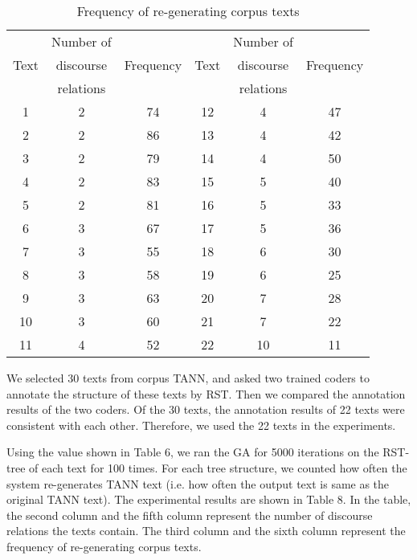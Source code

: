 \documentclass[english]{jnlp_1.2.0}
\begin{document}
\begin{table}[b]
\caption{Frequency of re-generating corpus texts} 
\begin{center}
 \begin{tabular}{|c|c|c||c|c|c|}               \hline
      & Number of &           &      & Number of &           \\ 
 Text & discourse & Frequency & Text & discourse & Frequency \\  
      & relations &           &      & relations &           \\ \hline \hline
1        &    2      &    74     & 12   &  4        & 47        \\ \hline
2        &    2      &    86     & 13   &  4        & 42        \\ \hline
3        &    2      &    79     & 14   &  4        & 50        \\ \hline
4        &    2      &    83     & 15   &  5        & 40        \\ \hline 
5        &    2      &    81     & 16   &  5        & 33        \\ \hline
6        &    3      &    67     & 17   &  5        & 36        \\ \hline 
7        &    3      &    55     & 18   &  6        & 30        \\ \hline
8        &    3      &    58     & 19   &  6        & 25        \\ \hline
9        &    3      &    63     & 20   &  7        & 28        \\ \hline
10       &    3      &    60     & 21   &  7        & 22        \\ \hline
11       &    4      &    52     & 22   &  10       & 11        \\ \hline 
\end{tabular}
\end{center}
\end{table}

We selected 30 texts from corpus TANN, and asked two trained coders to
annotate the structure of these texts by RST. Then we compared the 
annotation results of the two coders. Of the 30 texts, the annotation
results of 22 texts were consistent with each other. Therefore, 
we used the 22 texts in the experiments. 

Using the value shown in Table 6, we ran the GA for 5000 
iterations on the RST-tree of each text for 100 times. 
For each tree structure, we counted how often the system re-generates 
TANN text (i.e. how often the output text is same as the 
original TANN text). The experimental results are shown in Table 8. 
In the table, the second column and the fifth column represent the number 
of discourse relations the texts contain. The third column and the 
sixth column represent the frequency of re-generating corpus texts. 
\end{document}
